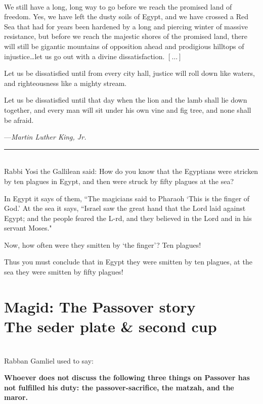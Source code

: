 \documentclass[letter,11pt,openany]{memoir}
\newcommand{\HgEllipsis}{\ensuremath{\left[\ldots\right]}}
\newcommand{\HgSource}[1]{\hfill{\small---\itshape{#1}}}
\newcommand{\HgHL}[1]{{\Large\textbf{#1}\par\noindent\\[-.5em]}}
\newcommand{\HgFill}{\vfill \hrule \vfill}
\newenvironment{HgEnglish}{\strut\\\noindent}{\vspace{1em}}
\newcommand{\LSrc}{\textsuperscript{\upshape{[L]}}}
\begin{document}
\begin{HgEnglish}
We still have a long, long way to go before we reach the promised land of
freedom. Yes, we have left the dusty soils of Egypt, and we have crossed a Red
Sea that had for years been hardened by a long and piercing winter of massive
resistance, but before we reach the majestic shores of the promised land, there
will still be gigantic mountains of opposition ahead and prodigious hilltops of
injustice\ldots{}let us go out with a divine dissatisfaction. \HgEllipsis

Let us be dissatisfied until from every city hall, justice will roll down like
waters, and righteousness like a mighty
stream.

Let us be dissatisfied until that day when the lion and the lamb shall lie down
together, and every man will sit under
his own vine and fig tree, and none shall be afraid.

\HgSource{Martin Luther King, Jr.}
\end{HgEnglish}

\HgFill

\begin{HgEnglish}
Rabbi Yosi the Gallilean said: How do you know that the Egyptians were stricken
by ten plagues in Egypt, and then were struck by fifty plagues at the sea?

In Egypt it says of them, ``The magicians said to Pharaoh `This is the finger of
God.' At the sea it says, ``Israel saw the great hand that the Lord laid against
Egypt; and the people feared the L-rd, and they believed in the Lord and in his
servant Moses."

Now, how often were they smitten by `the finger'? Ten plagues!

Thus you must conclude that in Egypt they were smitten by ten plagues, at the
sea they were smitten by fifty plagues! \LSrc

\end{HgEnglish}

\chapter*{Magid: The Passover story\\ {\LARGE The seder plate \& second cup}}
\vspace{-2em}

\begin{HgEnglish}
Rabban Gamliel used to say: \HgHL{Whoever does not discuss the following three
things on Passover has not fulfilled his duty: the passover-sacrifice, the
matzah, and the maror.}
\end{HgEnglish}
\end{document}
